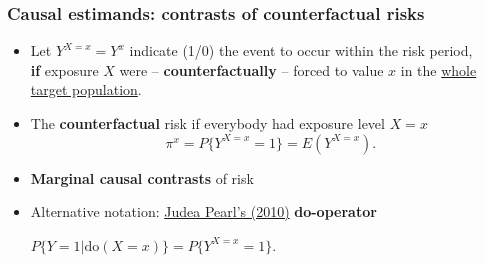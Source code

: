 \documentclass[12pt,dvipsnames,t,aspectratio=169, handout%
]{beamer}
\begin{document}
\begin{frame}
\frametitle{\large Causal estimands: contrasts of counterfactual risks}
\begin{itemize}
\item
Let $Y^{X=x} = Y^x$ %
indicate (1/0) the event to occur within the risk period, \\
\medskip
\textbf{if} exposure $X$ were 
-- \textbf{counterfactually} -- forced
to value $x$ in the \underline{whole target population}. 
\medskip
\item
The {\bf counterfactual} risk if everybody had exposure level $X=x$
$$  \pi^x = P \{ Y^{X=x} = 1 \} = E(Y^{X=x}). $$ %
\item
{\bf Marginal causal contrasts} of risk %
\medskip
{}
\medskip
\item
Alternative notation: \href{https://doi.org/10.2202/1557-4679.1203}{\color{blue}Judea Pearl's (2010)} {\bf do-operator} 
\begin{center}
$ P\{ Y=1| \text{do}(X=x)\} = P \{ Y^{X=x} = 1 \} . $
\end{center}

\end{itemize}  

\end{frame}
\end{document}
